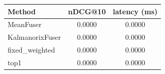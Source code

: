 \begin{tabular}{lcc}
\toprule
Method & nDCG@10 & latency (ms) \\
\midrule
MeanFuser & 0.0000 & 0.0000 \\
KalmanorixFuser & 0.0000 & 0.0000 \\
fixed_weighted & 0.0000 & 0.0000 \\
top1 & 0.0000 & 0.0000 \\
\bottomrule
\end{tabular}
